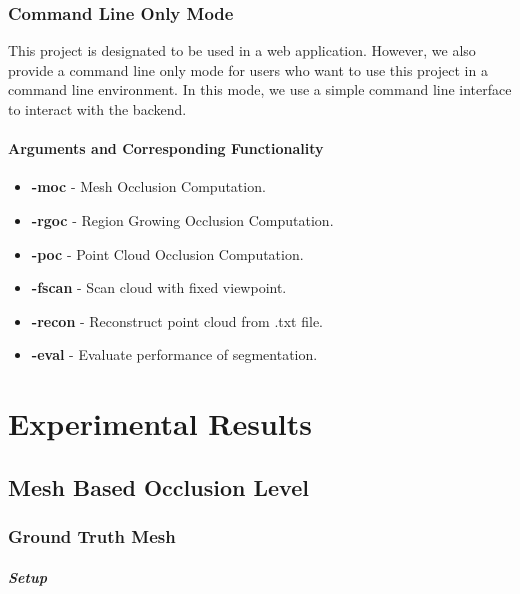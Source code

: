 \documentclass[11pt, a4paper,oneside,chapterprefix=false]{scrbook}
\begin{document}
\subsection{Command Line Only Mode}

This project is designated to be used in a web application. However, we also provide a command line only mode for users who want to use this project in a command line environment. In this mode, we use a simple command line interface to interact with the backend.

\subsubsection{Arguments and Corresponding Functionality}

\begin{itemize}
	\item \textbf{-moc} - Mesh Occlusion Computation.
	\item \textbf{-rgoc} - Region Growing Occlusion Computation.
	\item \textbf{-poc} - Point Cloud Occlusion Computation.
	\item \textbf{-fscan} - Scan cloud with fixed viewpoint.
	\item \textbf{-recon} - Reconstruct point cloud from .txt file.
	\item \textbf{-eval} - Evaluate performance of segmentation.
\end{itemize}


\chapter{Experimental Results} \label{chp:experiments}


\section{Mesh Based Occlusion Level}

\subsection{Ground Truth Mesh}

\paragraph{Setup}
\end{document}
